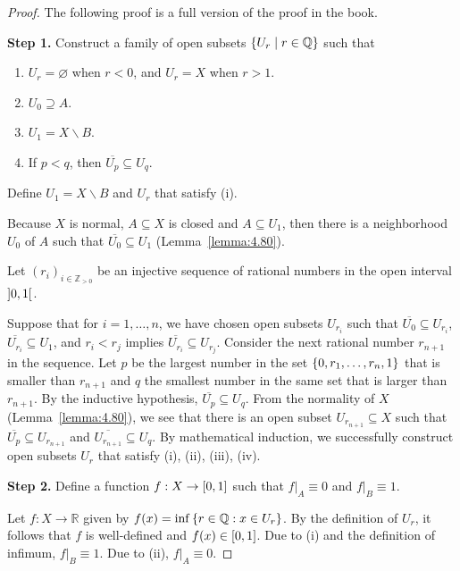 \begin{proof}
	The following proof is a full version of the proof in the book.

	\textbf{Step 1.} Construct a family of open subsets $\left\{{ U_{r} \mid r \in \mathbb{Q} }\right\}$ such that
	\begin{enumerate}[label={(\roman*)},itemsep=0pt,topsep=0pt]
		\item $U_{r} = \varnothing$ when $r < 0$, and $U_{r} = X$ when $r > 1$.
		\item $U_{0} \supseteq A$.
		\item $U_{1} = X\smallsetminus B$.
		\item If $p < q$, then $\overline{U_{p}} \subseteq U_{q}$.
	\end{enumerate}

	Define $U_{1} = X\smallsetminus B$ and $U_{r}$ that satisfy (i).

	Because $X$ is normal, $A\subseteq X$ is closed and $A\subseteq U_{1}$, then there is a neighborhood $U_{0}$ of $A$ such that $\overline{U_{0}} \subseteq U_{1}$ (Lemma~\ref{lemma:4.80}).

	Let ${(r_{i})}_{i\in\mathbb{Z}_{>0}}$ be an injective sequence of rational numbers in the open interval $\left]{0, 1}\right[$.

	Suppose that for $i = 1, \ldots, n$, we have chosen open subsets $U_{r_{i}}$ such that $\overline{U_{0}} \subseteq U_{r_{i}}$, $\overline{U_{r_{i}}} \subseteq U_{1}$, and $r_{i} < r_{j}$ implies $\overline{U_{r_{i}}} \subseteq U_{r_{j}}$. Consider the next rational number $r_{n+1}$ in the sequence. Let $p$ be the largest number in the set $\left\{{0, r_{1}, \ldots, r_{n}, 1}\right\}$ that is smaller than $r_{n+1}$ and $q$ the smallest number in the same set that is larger than $r_{n+1}$. By the inductive hypothesis, $\overline{U_{p}} \subseteq U_{q}$. From the normality of $X$ (Lemma~\ref{lemma:4.80}), we see that there is an open subset $U_{r_{n+1}} \subseteq X$ such that $\overline{U_{p}} \subseteq U_{r_{n+1}}$ and $\overline{U_{r_{n+1}}} \subseteq U_{q}$. By mathematical induction, we successfully construct open subsets $U_{r}$ that satisfy (i), (ii), (iii), (iv).

	\textbf{Step 2.} Define a function $f: X \to \left[{0,1}\right]$ such that $f\vert_{A}\equiv 0$ and $f\vert_{B}\equiv 1$.

	Let $f: X\to \mathbb{R}$ given by $f(x) = \inf\left\{{ r\in \mathbb{Q} : x\in U_{r} }\right\}$. By the definition of $U_{r}$, it follows that $f$ is well-defined and $f(x) \in \left[{0, 1}\right]$. Due to (i) and the definition of infimum, $f\vert_{B} \equiv 1$. Due to (ii), $f\vert_{A}\equiv 0$.


\end{proof}
